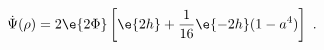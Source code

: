 \begin{equation}
\label{dotPsi_new}
  \dot{\Psi}(\rho) =  2 \e{2\Phi}
    \left[\e{2h} +\frac1{16} \e{-2h} (1-a^4) \right]~.
\end{equation}

